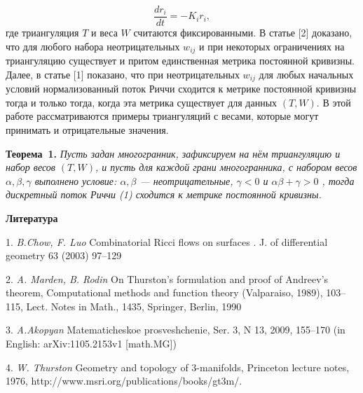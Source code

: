 $$
\dfrac{dr_i}{dt} = -K_i r_i,
$$
где триангуляция $T$ и веса $W$ считаются
фиксированными.
\newline
В статье [2] доказано, что для любого
набора неотрицательных
$w_{ij}$ и при некоторых ограничениях на
триангуляцию существует и
притом единственная метрика постоянной
кривизны. Далее, в статье [1]
показано, что при неотрицательных $w_{ij}$
для любых начальных
условий нормализованный поток Риччи
сходится к метрике постоянной
кривизны тогда и только тогда, когда эта
метрика существует для
данных $(T, W)$.
\newline
В этой работе рассматриваются примеры
триангуляций с весами, которые
могут принимать и отрицательные
значения.

\textbf{Теорема~1.} {\it Пусть задан многогранник, зафиксируем на нём триангуляцию и набор весов $(T, W)$, и пусть для каждой грани многогранника, с набором весов $ \alpha, \beta, \gamma $ выполнено условие: $\alpha, \beta$ --- неотрицательные, $\gamma < 0$ и $ \alpha \beta + \gamma > 0 $ , тогда дискретный поток Риччи (1) сходится к метрике постоянной кривизны.}

%

\smallskip \centerline{\bf Литература}\nopagebreak

1. {\it B.Chow, F. Luo} Combinatorial Ricci flows on surfaces . J. of differential geometry 63 (2003) 97–129

2. {\it A. Marden, B. Rodin} On Thurston’s formulation and proof of Andreev’s theorem, Computational methods and function theory (Valparaiso, 1989), 103–115, Lect. Notes in Math., 1435, Springer, Berlin, 1990

3. {\it A.Akopyan  } Matematicheskoe prosveshchenie, Ser. 3, N 13, 2009, 155–170 (in English: arXiv:1105.2153v1 [math.MG])

4. {\it W. Thurston } Geometry and topology of 3-manifolds, Princeton lecture notes, 1976, http://www.msri.org/publications/books/gt3m/. 